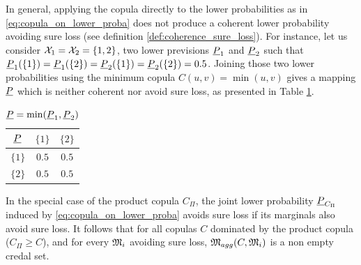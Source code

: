 In general, applying the copula directly to the lower probabilities as in \eqref{eq:copula_on_lower_proba} does not produce a coherent lower probability avoiding sure loss (see definition \ref{def:coherence_sure_loss}). For instance, let us consider ${\mathcal{X}}_1 = {\mathcal{X}}_2 = \{1, 2\}$, two lower previsions ${\underline{P}}_1$ and ${\underline{P}}_2$ such that ${\underline{P}}_1(\{1\}) = {\underline{P}}_1(\{2\}) = {\underline{P}}_2(\{1\}) = {\underline{P}}_2(\{2\}) = 0.5$. Joining those two lower probabilities using the minimum copula $C(u,v)=\min(u,v)$ gives a mapping ${\underline{P}}$ which is neither coherent nor avoid sure loss, as presented in Table \ref{tab:non_coherent_lower}.

\begin{table}[!ht]
    \centering
    \begin{tabular}{|c||c|c|}
        \hline
        \hspace{0.2cm} ${\underline{P}}$ \hspace{0.2cm} & \hspace{0.2cm} $\{1\}$ \hspace{0.2cm} & \hspace{0.2cm} $\{2\}$ \hspace{0.2cm} \\\hline\hline
        $\{1\}$ & $0.5$ & $0.5$ \\\hline
        $\{2\}$ & $0.5$ & $0.5$\\
        \hline
        \end{tabular}
        \caption{${\underline{P}} = \min({\underline{P}}_1, {\underline{P}}_2)$}
        \label{tab:non_coherent_lower}
\end{table}

\begin{proposition}
    In the special case of the product copula $C_\Pi$, the joint lower probability ${\underline{P}}_{C_\Pi}$ induced by \eqref{eq:copula_on_lower_proba} avoids sure loss if its marginals also avoid sure loss. It follows that for all copulas $C$ dominated by the product copula (\ie $C_\Pi\geqslant C$), and for every ${\mathfrak{M}}_i$ avoiding sure loss, ${\mathfrak{M}}_{agg}(C, {\mathfrak{M}}_i)$ is a non empty credal set.
\end{proposition}

